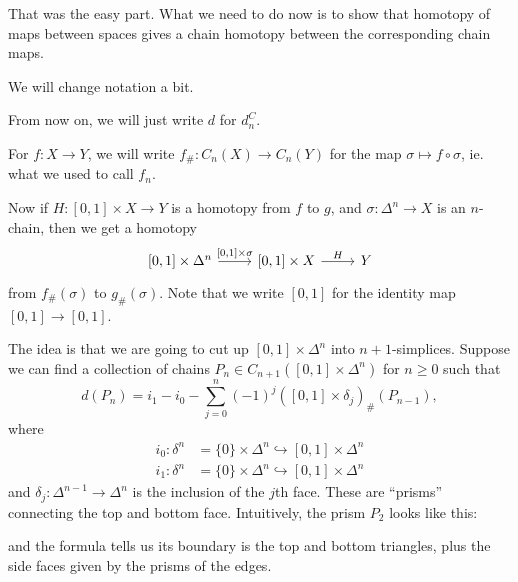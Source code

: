 \documentclass[a4paper]{article}
\theoremstyle{definition}
\begin{document}
That was the easy part. What we need to do now is to show that homotopy of maps between spaces gives a chain homotopy between the corresponding chain maps.

We will change notation a bit.
\begin{notation}
  From now on, we will just write $d$ for $d_n^C$.

  For $f: X \to Y$, we will write $f_\#: C_n(X) \to C_n(Y)$ for the map $\sigma \mapsto f \circ \sigma$, ie. what we used to call $f_n$.
\end{notation}

Now if $H: [0, 1] \times X \to Y$ is a homotopy from $f$ to $g$, and $\sigma: \Delta^n \to X$ is an $n$-chain, then we get a homotopy
\[
  \begin{tikzcd}
    \lbrack0, 1\rbrack \times \Delta^n \ar[r, "{[0, 1] \times \sigma}"] & \lbrack0, 1\rbrack \times X \ar[r, "H"] & Y
  \end{tikzcd}
\]
from $f_\#(\sigma)$ to $g_\#(\sigma)$. Note that we write $[0, 1]$ for the identity map $[0, 1] \to [0, 1]$.

The idea is that we are going to cut up $[0, 1] \times \Delta^n$ into $n + 1$-simplices. Suppose we can find a collection of chains $P_n \in C_{n + 1}([0, 1] \times \Delta^n)$ for $n \geq 0$ such that
\[
  d(P_n) = i_1 - i_0 - \sum_{j = 0}^n (-1)^j ([0, 1] \times \delta_j)_\#(P_{n - 1}),
\]
where
\begin{align*}
  i_0: \delta^n &= \{0\} \times \Delta^n \hookrightarrow [0, 1] \times \Delta^n\\
  i_1: \delta^n &= \{0\} \times \Delta^n \hookrightarrow [0, 1] \times \Delta^n
\end{align*}
and $\delta_j: \Delta^{n - 1} \to \Delta^n$ is the inclusion of the $j$th face. These are ``prisms'' connecting the top and bottom face. Intuitively, the prism $P_2$ looks like this:
\begin{center}
\end{center}
and the formula tells us its boundary is the top and bottom triangles, plus the side faces given by the prisms of the edges.
\end{document}
